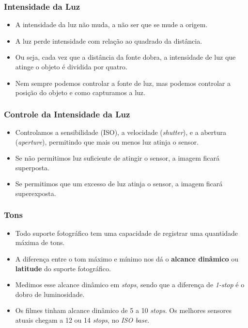
\begin{frame}
    \frametitle{Intensidade da Luz}
    \begin{itemize}
      \item A intensidade da luz não muda, a não ser que se mude a origem.
      \item A luz perde intensidade com relação ao quadrado da distância.
      \item Ou seja, cada vez que a distância da fonte dobra, a intensidade
      de luz que atinge o objeto é dividida por quatro.
      \item Nem sempre podemos controlar a fonte de luz, mas podemos controlar
      a posição do objeto e como capturamos a luz.
    \end{itemize}
\end{frame}

\begin{frame}
    \frametitle{Controle da Intensidade da Luz}
    \begin{itemize}
      \item Controlamos a sensibilidade (ISO), a velocidade (\textit{shutter}),
      e a abertura (\textit{aperture}), permitindo que mais ou menos luz atinja o sensor.
      \item Se não permitimos luz suficiente de atingir o sensor, a imagem ficará superposta.
      \item Se permitimos que um excesso de luz atinja o sensor, a imagem ficará superexposta.
    \end{itemize}
\end{frame}




\begin{frame}
    \frametitle{Tons}
    \begin{itemize}
      \item Todo suporte fotográfico tem uma capacidade de registrar uma quantidade máxima de tons.
      \item A diferença entre o tom máximo e mínimo nos dá o \textbf{alcance dinâmico} ou \textbf{latitude}
      do suporte fotográfico.
      \item Medimos esse alcance dinâmico em \textit{stops}, sendo que a diferença de \textit{1-stop} é o dobro
      de luminosidade.
      \item Os filmes tinham alcance dinâmico de 5 a 10 \textit{stops}. Os melhores sensores atuais
      chegam a 12 ou 14 \textit{stops}, no \textit{ISO base}.
    \end{itemize}
\end{frame}

